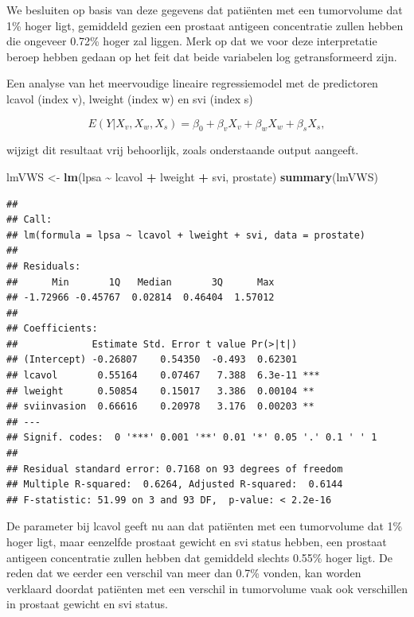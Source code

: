 \documentclass[
  12pt,dutch]{book}
\newenvironment{Shaded}{\begin{snugshade}}{\end{snugshade}}
\newcommand{\FunctionTok}[1]{\textcolor[rgb]{0.13,0.29,0.53}{\textbf{#1}}}
\newcommand{\NormalTok}[1]{#1}
\newcommand{\OtherTok}[1]{\textcolor[rgb]{0.56,0.35,0.01}{#1}}
\newcommand{\SpecialCharTok}[1]{\textcolor[rgb]{0.81,0.36,0.00}{\textbf{#1}}}
\theoremstyle{definition}
\theoremstyle{definition}
\theoremstyle{definition}
\theoremstyle{definition}
\theoremstyle{remark}
\begin{document}
We besluiten op basis van deze gegevens dat patiënten met een tumorvolume dat 1\% hoger ligt, gemiddeld gezien een prostaat antigeen concentratie zullen hebben die ongeveer 0.72\% hoger zal liggen. Merk op dat we voor deze interpretatie beroep hebben gedaan op het feit dat beide variabelen log getransformeerd zijn.

Een analyse van het meervoudige lineaire regressiemodel met de predictoren lcavol (index v), lweight (index w) en svi (index s)

\[
E(Y|X_v,X_w,X_s)=\beta_0 +\beta_v X_v+\beta_w X_w+\beta_s X_s,
\]

wijzigt dit resultaat vrij behoorlijk, zoals onderstaande output aangeeft.

\begin{Shaded}
\begin{Highlighting}[]
\NormalTok{lmVWS }\OtherTok{\textless{}{-}} \FunctionTok{lm}\NormalTok{(lpsa }\SpecialCharTok{\textasciitilde{}}\NormalTok{ lcavol }\SpecialCharTok{+}\NormalTok{ lweight }\SpecialCharTok{+}\NormalTok{ svi, prostate)}
\FunctionTok{summary}\NormalTok{(lmVWS)}
\end{Highlighting}
\end{Shaded}

\begin{verbatim}
## 
## Call:
## lm(formula = lpsa ~ lcavol + lweight + svi, data = prostate)
## 
## Residuals:
##      Min       1Q   Median       3Q      Max 
## -1.72966 -0.45767  0.02814  0.46404  1.57012 
## 
## Coefficients:
##             Estimate Std. Error t value Pr(>|t|)    
## (Intercept) -0.26807    0.54350  -0.493  0.62301    
## lcavol       0.55164    0.07467   7.388  6.3e-11 ***
## lweight      0.50854    0.15017   3.386  0.00104 ** 
## sviinvasion  0.66616    0.20978   3.176  0.00203 ** 
## ---
## Signif. codes:  0 '***' 0.001 '**' 0.01 '*' 0.05 '.' 0.1 ' ' 1
## 
## Residual standard error: 0.7168 on 93 degrees of freedom
## Multiple R-squared:  0.6264, Adjusted R-squared:  0.6144 
## F-statistic: 51.99 on 3 and 93 DF,  p-value: < 2.2e-16
\end{verbatim}

De parameter bij lcavol geeft nu aan dat patiënten met een tumorvolume dat 1\% hoger ligt, maar eenzelfde prostaat gewicht en svi status hebben, een prostaat antigeen concentratie zullen hebben dat gemiddeld slechts 0.55\% hoger ligt.
De reden dat we eerder een verschil van meer dan 0.7\% vonden, kan worden verklaard doordat patiënten met een verschil in tumorvolume vaak ook verschillen in prostaat gewicht en svi status.
\end{document}
